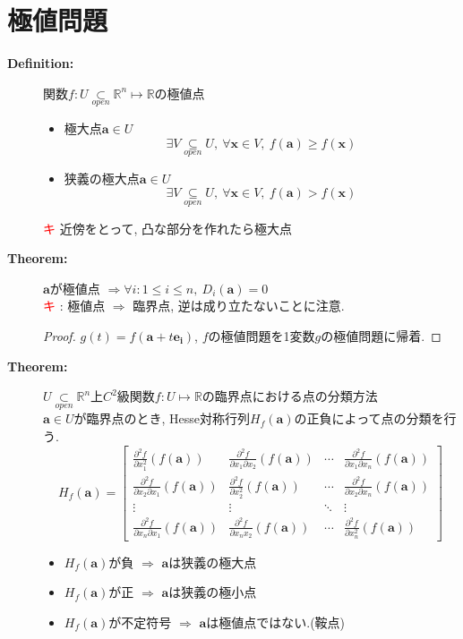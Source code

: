 \documentclass[dvipdfmx]{jsarticle}
\newcommand{\point}{\textcircled{\textcolor{red}{\scriptsize キ}} }
\begin{document}
\section{極値問題}
\begin{description}
    \item[\bf{Definition:}] 関数$f : U \underset{open}{\subset} \mathbb{R}^n \mapsto \mathbb{R}$の極値点
        \begin{itemize} 
            \item 極大点$\bm{a} \in U$
                $$ \exists V \underset{open}{\subseteq} U,\ \forall \bm{x} \in V,\ f(\bm{a}) \geq f(\bm{x}) $$
            \item 狭義の極大点$\bm{a} \in U$
                $$ \exists V \underset{open}{\subseteq} U,\ \forall \bm{x} \in V,\ f(\bm{a}) > f(\bm{x}) $$       
        \end{itemize}
        \point 近傍をとって, 凸な部分を作れたら極大点
    
    \item[\bf{Theorem:}] $\bm{a}$が極値点 $\Rightarrow \forall i : 1 \leq i \leq n,\ D_i(\bm{a}) = 0$ \\
        \point : 極値点 $\Rightarrow$ 臨界点, 逆は成り立たないことに注意. \\
        \begin{proof}
            $ g(t) = f(\bm{a} + t \bm{e_i}) $, $f$の極値問題を1変数$g$の極値問題に帰着.
        \end{proof}
    
    \item[\bf{Theorem:}] $U\underset{open}{\subset} \mathbb{R}^n$上$C^2$級関数$f : U \mapsto \mathbb{R}$の臨界点における点の分類方法 \\
        $\bm{a} \in U$が臨界点のとき, Hesse対称行列$H_f(\bm{a})$の正負によって点の分類を行う.
        $$ H_f(\bm{a}) = 
        \begin{bmatrix}
            \frac{\partial^2 f}{\partial x_1^2}(f(\bm{a})) & \frac{\partial^2 f}{\partial x_1 \partial x_2}(f(\bm{a})) & \cdots & \frac{\partial^2 f}{\partial x_1 \partial x_n}(f(\bm{a})) \\
            \frac{\partial^2 f}{\partial x_2 \partial x_1}(f(\bm{a})) & \frac{\partial^2 f}{\partial x_2^2}(f(\bm{a})) & \cdots & \frac{\partial^2 f}{\partial x_2 \partial x_n}(f(\bm{a})) \\
            \vdots & \vdots & \ddots & \vdots \\
            \frac{\partial^2 f}{\partial x_n \partial x_1}(f(\bm{a})) &  \frac{\partial^2 f}{\partial x_n x_2}(f(\bm{a})) & \cdots & \frac{\partial^2 f}{\partial x_n^2}(f(\bm{a}))
        \end{bmatrix} 
        $$
        \begin{itemize}
            \item $H_f(\bm{a})$が負 $\Rightarrow$ $\bm{a}$は狭義の極大点
            \item $H_f(\bm{a})$が正 $\Rightarrow$ $\bm{a}$は狭義の極小点
            \item $H_f(\bm{a})$が不定符号 $\Rightarrow$ $\bm{a}$は極値点ではない.(鞍点)
        \end{itemize}
        

\end{description}
\end{document}
